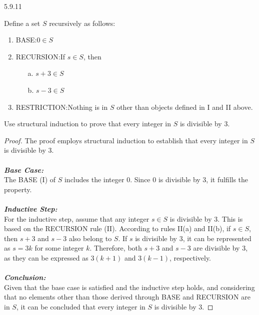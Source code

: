 \begin{question}
    {5.9.11}
    {
        Define a set $S$ recursively as follows:
        \vspace{-\baselineskip}
        \begin{enumerate}[label=\Roman*.]
            \item BASE:\@ $0 \in S$
            \item RECURSION:\@ If $s \in S$, then
                \begin{enumerate}
                    \item[a.] $s + 3 \in S$
                    \item[b.] $s - 3 \in S$
                \end{enumerate}
            \item RESTRICTION:\@ Nothing is in $S$ other than objects defined in I and II above.
        \end{enumerate}
        \vspace{-\baselineskip}
        Use structural induction to prove that every integer in $S$ is divisible by $3$.
    }
\end{question}
\begin{proof}
    The proof employs structural induction to establish that every integer in \(S\) is divisible by 3. \\ \\
    \textbf{\textit{Base Case:}} \\
    The BASE (I) of \(S\) includes the integer 0. Since 0 is divisible by 3, it fulfills the property. \\ \\
    \textbf{\textit{Inductive Step:}} \\
    For the inductive step, assume that any integer \(s \in S\) is divisible by 3. This is based on the RECURSION rule (II). According to rules II(a) and II(b), if \(s \in S\), then \(s + 3\) and \(s - 3\) also belong to \(S\). If \(s\) is divisible by 3, it can be represented as \(s = 3k\) for some integer \(k\). Therefore, both \(s + 3\) and \(s - 3\) are divisible by 3, as they can be expressed as \(3(k + 1)\) and \(3(k - 1)\), respectively. \\ \\
    \textbf{\textit{Conclusion:}} \\
    Given that the base case is satisfied and the inductive step holds, and considering that no elements other than those derived through BASE and RECURSION are in \(S\), it can be concluded that every integer in \(S\) is divisible by 3.
\end{proof}

